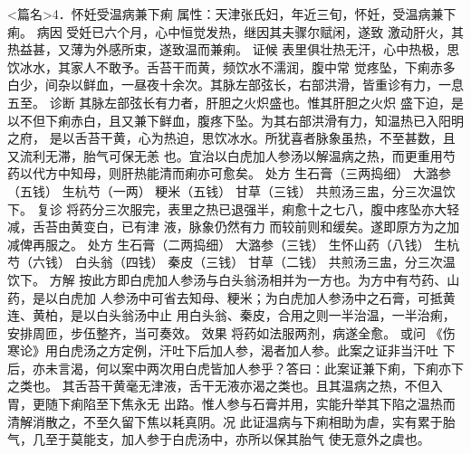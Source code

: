\documentclass[a4paper,12pt,UTF8,twoside]{ctexbook}
\begin{document}
<篇名>4．怀妊受温病兼下痢
属性：天津张氏妇，年近三旬，怀妊，受温病兼下痢。 
病因 受妊已六个月，心中恒觉发热，继因其夫骤尔赋闲，遂致 
激动肝火，其热益甚，又薄为外感所束，遂致温而兼痢。 
证候 表里俱壮热无汗，心中热极，思饮冰水，其家人不敢予。舌苔干而黄，频饮水不濡润，腹中常 
觉疼坠，下痢赤多白少，间杂以鲜血，一昼夜十余次。其脉左部弦长，右部洪滑，皆重诊有力，一息五至。 
诊断 其脉左部弦长有力者，肝胆之火炽盛也。惟其肝胆之火炽 
盛下迫，是以不但下痢赤白，且又兼下鲜血，腹疼下坠。为其右部洪滑有力，知温热已入阳明之府， 
是以舌苔干黄，心为热迫，思饮冰水。所犹喜者脉象虽热，不至甚数，且又流利无滞，胎气可保无恙 
也。宜治以白虎加人参汤以解温病之热，而更重用芍药以代方中知母，则肝热能清而痢亦可愈矣。 
处方 生石膏（三两捣细） 大潞参（五钱） 生杭芍（一两） 粳米（五钱） 甘草（三钱） 
共煎汤三盅，分三次温饮下。 
复诊 将药分三次服完，表里之热已退强半，痢愈十之七八，腹中疼坠亦大轻减，舌苔由黄变白，已有津 
液，脉象仍然有力 
而较前则和缓矣。遂即原方为之加减俾再服之。 
处方 生石膏（二两捣细） 大潞参（三钱） 生怀山药（八钱） 生杭芍（六钱） 
白头翁（四钱） 秦皮（三钱） 甘草（二钱） 
共煎汤三盅，分三次温饮下。 
方解 按此方即白虎加人参汤与白头翁汤相并为一方也。为方中有芍药、山药，是以白虎加 
人参汤中可省去知母、粳米；为白虎加人参汤中之石膏，可抵黄连、黄柏，是以白头翁汤中止 
用白头翁、秦皮，合用之则一半治温，一半治痢，安排周匝，步伍整齐，当可奏效。 
效果 将药如法服两剂，病遂全愈。 
或问 《伤寒论》用白虎汤之方定例，汗吐下后加人参，渴者加人参。此案之证非当汗吐 
下后，亦未言渴，何以案中两次用白虎皆加人参乎？答曰∶此案证兼下痢，下痢亦下之类也。 
其舌苔干黄毫无津液，舌干无液亦渴之类也。且其温病之热，不但入胃，更随下痢陷至下焦永无 
出路。惟人参与石膏并用，实能升举其下陷之温热而清解消散之，不至久留下焦以耗真阴。况 
此证温病与下痢相助为虐，实有累于胎气，几至于莫能支，加人参于白虎汤中，亦所以保其胎气 
使无意外之虞也。 
\end{document}
